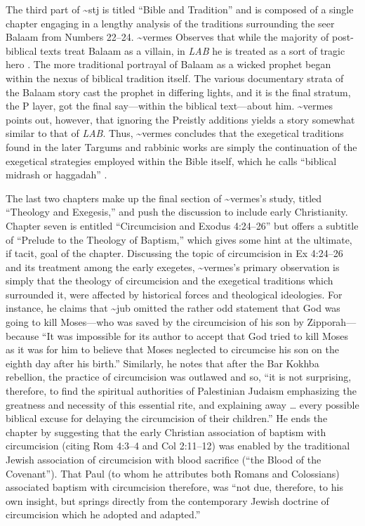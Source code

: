 The third part of \textasciitilde{}stj is titled ``Bible and Tradition''
and is composed of a single chapter engaging in a lengthy analysis of
the traditions surrounding the seer Balaam from Numbers 22--24.
\textasciitilde{}vermes Observes that while the majority of
post-biblical texts treat Balaam as a villain, in \emph{LAB} he is
treated as a sort of tragic hero \autocite[173]{vermes1961}. The more
traditional portrayal of Balaam as a wicked prophet began within the
nexus of biblical tradition itself. The various documentary strata of
the Balaam story cast the prophet in differing lights, and it is the
final stratum, the P layer, got the final say---within the biblical
text---about him. \textasciitilde{}vermes points out, however, that
ignoring the Preistly additions yields a story somewhat similar to that
of \emph{LAB}. Thus, \textasciitilde{}vermes concludes that the
exegetical traditions found in the later Targums and rabbinic works are
simply the continuation of the exegetical strategies employed within the
Bible itself, which he calls ``biblical midrash or haggadah''
\autocite[176]{vermes1961}.

The last two chapters make up the final section of
\textasciitilde{}vermes's study, titled ``Theology and Exegesis,'' and
push the discussion to include early Christianity. Chapter seven is
entitled ``Circumcision and Exodus 4:24--26'' but offers a subtitle of
``Prelude to the Theology of Baptism,'' which gives some hint at the
ultimate, if tacit, goal of the chapter. Discussing the topic of
circumcision in Ex 4:24--26 and its treatment among the early exegetes,
\textasciitilde{}vermes's primary observation is simply that the
theology of circumcision and the exegetical traditions which surrounded
it, were affected by historical forces and theological ideologies. For
instance, he claims that \textasciitilde{}jub omitted the rather odd
statement that God was going to kill Moses---who was saved by the
circumcision of his son by Zipporah---because ``It was impossible for
its author to accept that God tried to kill Moses as it was for him to
believe that Moses neglected to circumcise his son on the eighth day
after his birth.''\autocite[185]{vermes1961} Similarly, he notes that
after the Bar Kokhba rebellion, the practice of circumcision was
outlawed and so, ``it is not surprising, therefore, to find the
spiritual authorities of Palestinian Judaism emphasizing the greatness
and necessity of this essential rite, and explaining away \ldots{} every
possible biblical excuse for delaying the circumcision of their
children.''\autocite[189]{vermes1961} He ends the chapter by suggesting
that the early Christian association of baptism with circumcision
(citing Rom 4:3--4 and Col 2:11--12) was enabled by the traditional
Jewish association of circumcision with blood sacrifice (``the Blood of
the Covenant'')\autocite[190]{vermes1961}. That Paul (to whom he
attributes both Romans and Colossians) associated baptism with
circumcision therefore, was ``not due, therefore, to his own insight,
but springs directly from the contemporary Jewish doctrine of
circumcision which he adopted and adapted.''\autocite[191]{vermes1961}

